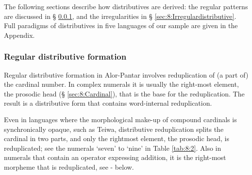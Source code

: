     

 

 

The following sections describe how distributives are derived: the regular patterns are discussed in {\S} \ref{sec:8:Regulardistributive}, and the irregularities in {\S} \ref{sec:8:Irregulardistributive}.  Full paradigms of distributives in five languages of our sample are given in the Appendix.

\subsubsection{Regular distributive formation  }
\label{sec:8:Regulardistributive}
Regular distributive formation in Alor-Pantar involves reduplication of (a part of) the cardinal number. In complex numerals it is usually the right-most element, the prosodic head ({\S} \ref{sec:8:Cardinal}), that is the base for the reduplication. The result is a distributive form that contains word-internal reduplication. 

Even in languages where the morphological make-up of compound cardinals is synchronically opaque, such as Teiwa, distributive reduplication splits the cardinal in two parts, and only the rightmost element, the prosodic head, is reduplicated; see the numerals `seven' to `nine' in Table \ref{tab:8:2}. Also in numerals that contain an operator expressing addition, it is the right-most morpheme that is reduplicated, see - below.
 


